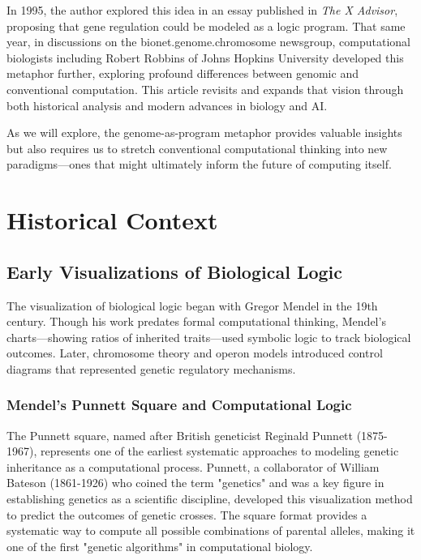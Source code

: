 \documentclass[11pt]{article}
\begin{document}
In 1995, the author explored this idea in an essay published in \textit{The X Advisor}, proposing that gene regulation could be modeled as a logic program. That same year, in discussions on the bionet.genome.chromosome newsgroup, computational biologists including Robert Robbins of Johns Hopkins University developed this metaphor further, exploring profound differences between genomic and conventional computation. This article revisits and expands that vision through both historical analysis and modern advances in biology and AI.

As we will explore, the genome-as-program metaphor provides valuable insights but also requires us to stretch conventional computational thinking into new paradigms—ones that might ultimately inform the future of computing itself.

\section{Historical Context}

\subsection{Early Visualizations of Biological Logic}

The visualization of biological logic began with Gregor Mendel in the 19th century. Though his work predates formal computational thinking, Mendel's charts—showing ratios of inherited traits—used symbolic logic to track biological outcomes. Later, chromosome theory and operon models introduced control diagrams that represented genetic regulatory mechanisms.

\subsubsection{Mendel's Punnett Square and Computational Logic}

The Punnett square, named after British geneticist Reginald Punnett (1875-1967), represents one of the earliest systematic approaches to modeling genetic inheritance as a computational process. Punnett, a collaborator of William Bateson (1861-1926) who coined the term "genetics" and was a key figure in establishing genetics as a scientific discipline, developed this visualization method to predict the outcomes of genetic crosses. The square format provides a systematic way to compute all possible combinations of parental alleles, making it one of the first "genetic algorithms" in computational biology.
\end{document}
